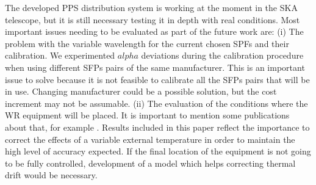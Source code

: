 The developed PPS distribution system is working at the moment in the SKA 
telescope, but it is still necessary testing it in depth with real conditions. 
Most important issues needing to be evaluated as part of 
the future work are: (i) The problem with the variable wavelength for the 
current chosen SPFs and their calibration. We experimented $alpha$ deviations 
during the calibration procedure when using different SFPs pairs of the same 
manufacturer. This is an important issue to solve because it is not feasible to 
calibrate all the SFPs pairs that will be in use. Changing manufacturer could 
be a possible solution, but the cost increment may not be assumable.  (ii) The 
evaluation of the conditions where the WR equipment will be placed. It is 
important to mention some publications about that, for example \cite{Li2015a}. 
Results included in this paper reflect the importance to correct the effects of 
a variable external temperature in order to maintain the high level of accuracy 
expected. If the final location of the equipment is not going to be fully 
controlled, development of a model which helps correcting thermal drift would 
be necessary.